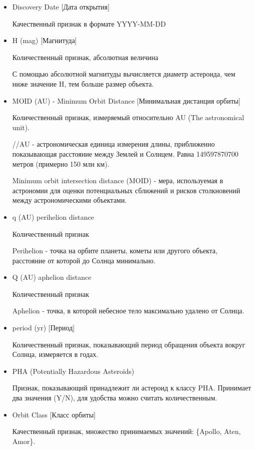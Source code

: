 \documentclass{article}
\begin{document}
\begin{itemize}
\item {Discovery Date [Дата открытия]} 

Качественный признак в формате YYYY-MM-DD

\item {H (mag) [Магнитуда]}

Количественный признак, абсолютная величина

С помощью абсолютной магнитуды вычисляется диаметр астероида, чем ниже значение H, тем больше размер объекта.

\item {MOID (AU) - Minimum Orbit Distance [Минимальная дистанция орбиты]}

Количественный признак, измеряемый относительно AU (The astronomical unit).

//AU - астрономическая единица измерения длины, приближенно показывающая расстояние между Землей и Солнцем. Равна 149597870700 метров (примерно 150 млн км).

Minimum orbit intersection distance (MOID) - мера, используемая в астрономии для оценки потенциальных сближений и рисков столкновений между астрономическими объектами.

\item {q (AU) perihelion distance}

Количественный признак

Perihelion - точка на орбите планеты, кометы или другого объекта, расстояние от которой до Солнца минимально.

\item {Q (AU) aphelion distance}

Количественный признак

Aphelion - точка, в которой небесное тело максимально удалено от Солнца.

\item {period (yr) [Период]}

Количественный признак, показывающий период обращения объекта вокруг Солнца, измеряется в годах.


\item {PHA (Potentially Hazardous Asteroids)}

Признак, показывающий принадлежит ли астероид к классу PHA. 
Принимает два значения (Y/N), для удобства можно считать количественным. 

\item {Orbit Class [Класс орбиты]}

Качественный признак, множество принимаемых значений: \{Apollo, Aten, Amor\}.\\[0.3cm]

\end{itemize} 
\end{document}
